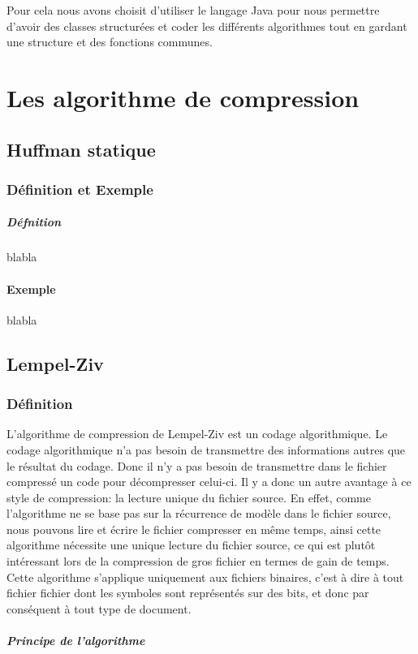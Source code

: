 \documentclass{report}
\begin{document}
Pour cela nous avons choisit d'utiliser le langage Java pour nous permettre d'avoir des classes structurées et coder les différents algorithmes tout en gardant une structure et des fonctions communes.
 
\part{Les algorithme de compression}
\chapter*{Huffman statique}
\section*{Définition et Exemple }
\subsubsection*{Défnition}
blabla 
\subsection*{Exemple}
blabla
\chapter*{Lempel-Ziv}
\section*{Définition }

L'algorithme de compression de Lempel-Ziv est un codage algorithmique.  Le codage algorithmique n’a pas besoin de transmettre des informations autres que le résultat du codage. Donc il n'y a pas besoin de transmettre dans le fichier compressé un code pour décompresser celui-ci. Il y a donc un autre avantage à ce style de compression: la lecture unique du fichier source. En effet, comme l'algorithme ne se base pas sur la récurrence de modèle dans le fichier source, nous pouvons lire et écrire le fichier compresser en même temps, ainsi cette algorithme nécessite une unique lecture du fichier source, ce qui est plutôt intéressant lors de la compression de gros fichier en termes de gain de temps. 
Cette algorithme s'applique uniquement aux fichiers binaires, c'est à dire à tout fichier fichier dont les symboles sont représentés sur des bits, et donc par conséquent à tout type de document. 
\subsubsection{Principe de l'algorithme}
\end{document}
